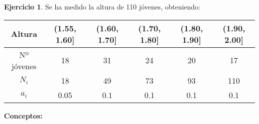 \documentclass[a4paper, 12pt]{article}
\theoremstyle{definition}
\newtheorem{ej}{Ejercicio}
\begin{document}
\bigskip
\begin{ej}
Se ha medido la altura de 110 jóvenes, obteniendo:

\begin{center}
    \begin{tabular}{|c|c|c|c|c|c|}
    \hline
    Altura & (1.55, 1.60] & (1.60, 1.70] & (1.70, 1.80] & (1.80, 1.90] & (1.90, 2.00] \\
    \hline
    Nº jóvenes & 18 & 31 & 24 & 20 & 17 \\
    \hline
     $N_{i}$ & 18 & 49 & 73 & 93 & 110 \\
    \hline
    $a_{i}$ & 0.05 & 0.1 & 0.1 & 0.1 & 0.1 \\
    \hline
    \end{tabular}
\end{center}

\bigskip
\textbf{Conceptos:}
\begin{center}
\end{center}
\bigskip


\end{ej}
\end{document}
